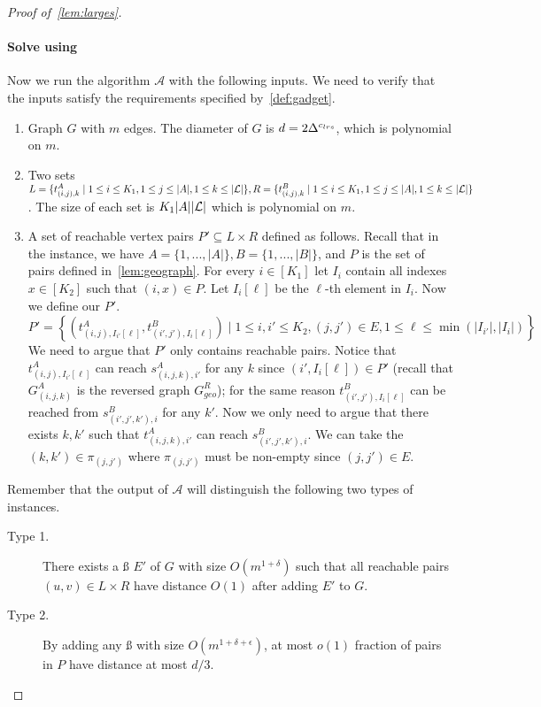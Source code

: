 \begin{proof}[Proof of~\cref{lem:larges}]
	\paragraph{Solve \labcov{} using } Now we run the  algorithm $\mathcal{A}$ with the following inputs. We need to verify that the inputs satisfy the requirements specified by~\cref{def:gadget}.
	\begin{enumerate}
		\item Graph $G$ with $m$ edges. The diameter of $G$ is $d=2\Delta^{{c_{lrs}}{}}$, which is polynomial on $m$.
		\item Two sets $L=\{t^A_{(i,j),k}\mid 1\le i\le K_1,1\le j\le |A|,1\le k\le |\mathcal{L}|\}, R=\{t^B_{(i,j),k}\mid  1\le i\le K_1,1\le j\le |A|,1\le k\le |\mathcal{L}|\}$. The size of each set is $K_1|A||\mathcal{L}|$ which is polynomial on $m$.
		\item A set of reachable vertex pairs $P'\subseteq L\times R$ defined as follows. Recall that in the \labcov{} instance, we have $A=\{1,...,|A|\},B=\{1,...,|B|\}$, and $P$ is the set of pairs defined in~\cref{lem:geograph}. For every $i\in[K_1]$ let $I_{i}$ contain all indexes $x\in[K_2]$ such that $(i,x)\in P$. Let $I_{i}[\ell]$ be the $\ell$-th element in $I_{i}$. 
		Now we define our $P'$.
		\[P'=\left\{\left(t^A_{(i,j),I_{i'}[\ell]},t^B_{(i',j'),I_{i}[\ell]}\right)\mid 1\le i,i'\le K_2,(j,j')\in E,1\le\ell\le\min(|I_{i'}|,|I_{i}|)\right\}\]
		We need to argue that $P'$ only contains reachable pairs. Notice that $t^A_{(i,j),I_{i'}[\ell]}$ can reach $s^A_{(i,j,k),i'}$ for any $k$ since $(i',I_{i}[\ell])\in P'$ (recall that $G^A_{(i,j,k)}$ is the reversed graph $G^R_{geo}$); for the same reason $t^B_{(i',j'),I_{i}[\ell]}$ can be reached from $s^B_{(i',j',k'),i}$ for any $k'$. Now we only need to argue that there exists $k,k'$ such that $t^A_{(i,j,k),i'}$ can reach $s^B_{(i',j',k'),i}$. We can take the $(k,k')\in \pi_{(j,j')}$ where $\pi_{(j,j')}$ must be non-empty since $(j,j')\in E$.
	\end{enumerate}
	Remember that the output of $\mathcal{A}$ will distinguish the following two types of instances. 
	\begin{description}
		\item[Type 1.] There exists a \ss{} $E'$ of $G$ with size $O(m^{1+\delta})$ such that all reachable pairs $(u,v)\in L\times R$ have distance $O(1)$ after adding $E'$ to $G$. %
		\item[Type 2.] By adding any \ss{} with size $O(m^{1+\delta+\epsilon})$, at most $o(1)$ fraction of pairs in $P$ have distance at most $d/3$.  
	\end{description}
	

\end{proof}
